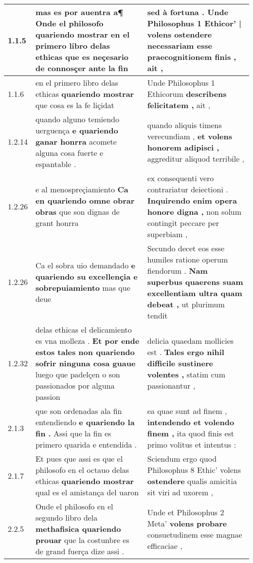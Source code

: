 \begin{tabular}{|p{1cm}|p{6.5cm}|p{6.5cm}|}

\hline
1.1.5 & mas es por auentra \textbf{ a¶ Onde el philosofo quariendo mostrar en el primero libro delas ethicas } que es neçesario de connosçer ante la fin & sed à fortuna . \textbf{ Unde Philosophus 1 Ethicor’ | volens ostendere } necessariam esse praecognitionem finis , ait , \\\hline
1.1.6 & en el primero libro delas ethicas \textbf{ quariendo mostrar } que cosa es la fe liçidat & Unde Philosophus 1 Ethicorum \textbf{ describens felicitatem , } ait , \\\hline
1.2.14 & quando alguno temiendo uerguença \textbf{ e quariendo ganar honrra } acomete alguna cosa fuerte e espantable . & quando aliquis timens verecundiam , \textbf{ et volens honorem adipisci , } aggreditur aliquod terribile , \\\hline
1.2.26 & e al menospreçiamiento \textbf{ Ca en quariendo omne obrar obras } que son dignas de grant honrra & ex consequenti vero contrariatur deiectioni . \textbf{ Inquirendo enim opera honore digna , } non solum contingit peccare per superbiam , \\\hline
1.2.26 & Ca el sobra uio demandado \textbf{ e quariendo su excellençia e sobrepuiamiento } mas que deue & Secundo decet eos esse humiles ratione operum fiendorum . \textbf{ Nam superbus quaerens suam excellentiam ultra quam debeat , } ut plurimum tendit \\\hline
1.2.32 & delas ethicas el delicamiento es vna molleza . \textbf{ Et por ende estos tales non quariendo sofrir ninguna cosa guaue } luego que padelçen o son passionados por alguna passion & delicia quaedam mollicies est . \textbf{ Tales ergo nihil difficile sustinere volentes , } statim cum passionantur , \\\hline
2.1.3 & que son ordenadas ala fin entendiendo \textbf{ e quariendo la fin . } Assi que la fin es primero quarida e entendida . & ea quae sunt ad finem , \textbf{ intendendo et volendo finem , } ita quod finis est primo volitus et intentus : \\\hline
2.1.7 & Et pues que assi es que el philosofo en el octauo delas ethicas \textbf{ quariendo mostrar } qual es el amistança del uaron & Sciendum ergo quod Philosophus 8 Ethic’ volens \textbf{ ostendere } qualis amicitia sit viri ad uxorem , \\\hline
2.2.5 & Onde el philosofo en el segundo libro dela \textbf{ methafisica quariendo prouar } que la costunbre es de grand fuerça dize assi . & Unde et Philosophus 2 Meta’ \textbf{ volens probare } consuetudinem esse magnae efficaciae , \\\hline

\end{tabular}
